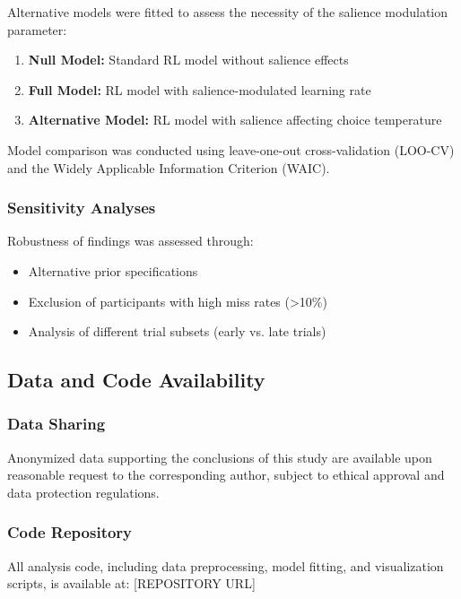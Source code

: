 Alternative models were fitted to assess the necessity of the salience modulation parameter:

\begin{enumerate}
\item \textbf{Null Model:} Standard RL model without salience effects
\item \textbf{Full Model:} RL model with salience-modulated learning rate
\item \textbf{Alternative Model:} RL model with salience affecting choice temperature
\end{enumerate}

Model comparison was conducted using leave-one-out cross-validation (LOO-CV) and the Widely Applicable Information Criterion (WAIC).

\subsubsection{Sensitivity Analyses}

Robustness of findings was assessed through:
\begin{itemize}
\item Alternative prior specifications
\item Exclusion of participants with high miss rates (>10\%)
\item Analysis of different trial subsets (early vs. late trials)
\end{itemize}

\subsection{Data and Code Availability}

\subsubsection{Data Sharing}

Anonymized data supporting the conclusions of this study are available upon reasonable request to the corresponding author, subject to ethical approval and data protection regulations.

\subsubsection{Code Repository}

All analysis code, including data preprocessing, model fitting, and visualization scripts, is available at: [REPOSITORY URL]

